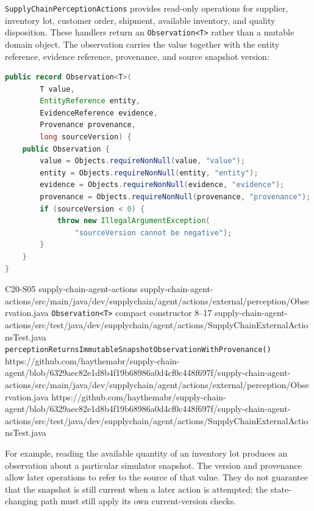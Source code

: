 \Needspace{0.75\textheight}

\texttt{SupplyChainPerceptionActions} provides read-only operations for supplier, inventory lot, customer order, shipment, available inventory, and quality disposition. These handlers return an \texttt{Observation<T>} rather than a mutable domain object. The observation carries the value together with the entity reference, evidence reference, provenance, and source snapshot version:

\begin{minipage}{\linewidth}
\begin{lstlisting}[language=Java,caption={A perception result remains tied to its source entity and snapshot.},label={lst:ch20-observation}]
public record Observation<T>(
        T value,
        EntityReference entity,
        EvidenceReference evidence,
        Provenance provenance,
        long sourceVersion) {
    public Observation {
        value = Objects.requireNonNull(value, "value");
        entity = Objects.requireNonNull(entity, "entity");
        evidence = Objects.requireNonNull(evidence, "evidence");
        provenance = Objects.requireNonNull(provenance, "provenance");
        if (sourceVersion < 0) {
            throw new IllegalArgumentException(
                "sourceVersion cannot be negative");
        }
    }
}
\end{lstlisting}
\end{minipage}

\BookSourceReferenceNoQR
  {C20-S05}
  {supply-chain-agent-actions}
  {supply-chain-agent-actions/src/main/java/dev/supplychain/agent/actions/external/perception/Observation.java}
  {\texttt{Observation<T>} compact constructor}
  {8--17}
  {supply-chain-agent-actions/src/test/java/dev/supplychain/agent/actions/SupplyChainExternalActionsTest.java}
  {\texttt{perceptionReturnsImmutableSnapshotObservationWithProvenance()}}
  {https://github.com/haythemabr/supply-chain-agent/blob/6329aec82e1d8b4f19b68986a0d4cf0c448f697f/supply-chain-agent-actions/src/main/java/dev/supplychain/agent/actions/external/perception/Observation.java}
  {https://github.com/haythemabr/supply-chain-agent/blob/6329aec82e1d8b4f19b68986a0d4cf0c448f697f/supply-chain-agent-actions/src/test/java/dev/supplychain/agent/actions/SupplyChainExternalActionsTest.java}

For example, reading the available quantity of an inventory lot produces an observation about a particular simulator snapshot. The version and provenance allow later operations to refer to the source of that value. They do not guarantee that the snapshot is still current when a later action is attempted; the state-changing path must still apply its own current-version checks.

